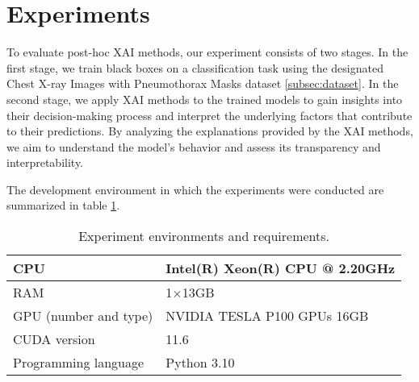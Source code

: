 \section{Experiments}
To evaluate post-hoc XAI methods, our experiment consists of two stages. In the first stage, we train black boxes on a classification task using the designated Chest X-ray Images with Pneumothorax Masks dataset \ref{subsec:dataset}. In the second stage, we apply XAI methods to the trained models to gain insights into their decision-making process and interpret the underlying factors that contribute to their predictions. By analyzing the explanations provided by the XAI methods, we aim to understand the model's behavior and assess its transparency and interpretability.

The development environment in which the experiments were conducted are summarized in table \ref{table:env}.

\begin{table}[t]
\caption{Experiment environments and requirements.}\label{table:env}
\centering
\begin{tabular}{ll}
\hline
CPU   & Intel(R) Xeon(R) CPU @ 2.20GHz \\
\hline
RAM                         &1$\times $13GB \\
\hline
GPU (number and type)                         & NVIDIA TESLA P100 GPUs 16GB\\
\hline
CUDA version                  & 11.6\\                          \hline
Programming language                 & Python 3.10\\ 
\hline
\end{tabular}
\end{table}


